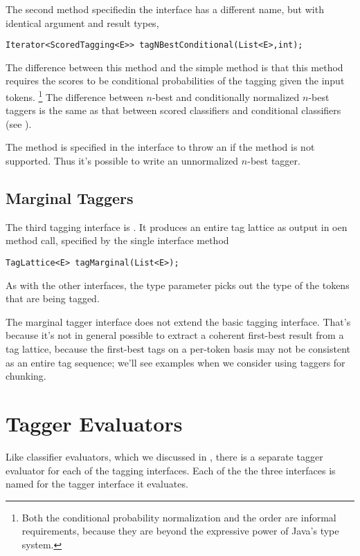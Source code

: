 The second method specifiedin the interface has a different name, but
with identical argument and result types,
%
\begin{verbatim}
Iterator<ScoredTagging<E>> tagNBestConditional(List<E>,int);
\end{verbatim}
%
The difference between this method and the simple 
method is that this method requires the scores to be conditional
probabilities of the tagging given the input tokens.%
%
\footnote{Both the conditional probability normalization and the
order are informal requirements, because they are beyond the expressive
power of Java's type system.}
%
The difference between $n$-best and conditionally normalized $n$-best
taggers is the same as that between scored classifiers and conditional
classifiers (see ).

The  method is specified in the interface
to throw an  if the method is not
supported.  Thus it's possible to write an unnormalized $n$-best
tagger.  


\subsection{Marginal Taggers}

The third tagging interface is .  It produces
an entire tag lattice as output in oen method call, specified by the
single interface method
%
\begin{verbatim}
TagLattice<E> tagMarginal(List<E>);
\end{verbatim}
%
As with the other interfaces, the type parameter  picks out
the type of the tokens that are being tagged.  

The marginal tagger interface does not extend the basic tagging
interface.  That's because it's not in general possible to extract
a coherent first-best result from a tag lattice, because the
first-best tags on a per-token basis may not be consistent as an
entire tag sequence;  we'll see examples when we consider using taggers
for chunking.


\section{Tagger Evaluators}

Like classifier evaluators, which we discussed in
, there is a separate tagger evaluator
for each of the tagging interfaces.  Each of the the three interfaces is
named for the tagger interface it evaluates.

